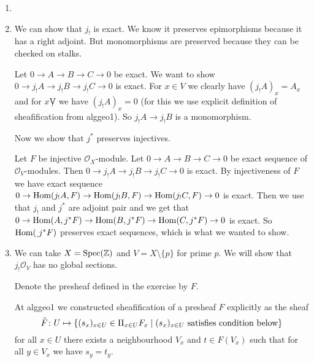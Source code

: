 \newcommand{\sheet}{8}




\maketitle{}

\begin{exercise}{3}
    \begin{enumerate}
        \item{
            }
        \item{
                We can show that $j_!$ is exact. We know it preserves
                epimorphisms because it has a right adjoint. But monomorphisms
                are preserved because they can be checked on stalks.

                Let $0 \to A \to B \to C \to 0$ be exact. We want to show $0 \to
                j_! A \to j_! B \to j_! C \to 0$ is exact. For $x \in V$ we
                clearly have $(j_! A)_x = A_x$ and for $x \not V$ we have $(j_!
                A)_x = 0$ (for this we use explicit definition of sheafification
                from alggeo1). So $j_! A \to j_! B$ is a monomorphism.

                Now we show that $j^*$ preserves injectives.

                Let $F$ be injective $\mathcal{O}_X$-module.
                Let $0 \to A \to B \to C \to 0$ be exact sequence of
                $\mathcal{O}_V$-modules.
                Then $0 \to j_! A \to j_! B \to j_! C \to 0$ is exact.
                By injectiveness of $F$ we have exact sequence $0 \to \operatorname{Hom}(j_!
                A, F) \to \operatorname{Hom}(j_! B, F) \to \operatorname{Hom}(j_! C, F) \to 0$ is exact.
                Then we use that $j_!$ and $j^*$ are adjoint pair and we get
                that $0 \to \operatorname{Hom}(A, j^* F) \to \operatorname{Hom}(B, j^* F) \to \operatorname{Hom}(C, j^* F)
                \to 0$ is exact. So $\operatorname{Hom}(_, j^* F)$ preserves exact sequences,
                which is what we wanted to show.
            }
        \item{
                We can take $X = \operatorname{Spec}(\mathbb{Z})$ and $V = X \setminus \{ p \}$ for
                prime $p$. We will show that $j_! \mathcal{O}_V$ has no
                global sections.

                Denote the presheaf defined in the exercise by $F$.

                At alggeo1 we constructed sheafification of a
                presheaf $F$ explicitly as the sheaf
                \begin{equation*}
                        \tilde{F} \colon U \mapsto \{ (s_x)_{x \in U} \in \Pi_{x
                        \in U} F_x \mid 
                        (s_x)_{x \in U}\ \text{satisfies condition below} \} \\
                \end{equation*}
                for all $x \in U$ there exists a neighbourhood $V_x$ and $t \in
                F(V_x)$ such that for all $y \in V_x$ we have $s_y = t_y$.

}
\end{enumerate}
\end{exercise}
